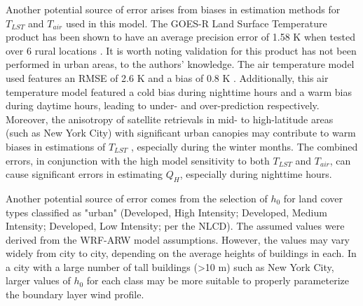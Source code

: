Another potential source of error arises from biases in estimation methods for $T_{LST}$ and $T_{air}$ used in this model. The GOES-R Land Surface Temperature product has been shown to have an average precision error of 1.58 K when tested over 6 rural locations \citep{Yu_2011}. It is worth noting validation for this product has not been performed in urban areas, to the authors' knowledge. The air temperature model used features an RMSE of 2.6 K and a bias of 0.8 K \citep{Hrisko_2020}. Additionally, this air temperature model featured a cold bias during nighttime hours and a warm bias during daytime hours, leading to under- and over-prediction respectively.  Moreover, the anisotropy of satellite retrievals in mid- to high-latitude areas (such as New York City) with significant urban canopies may contribute to warm biases in estimations of $T_{LST}$ \citep{Vinnikov_2012, Wang_2021}, especially during the winter months. The combined errors, in conjunction with the high model sensitivity to both $T_{LST}$ and $T_{air}$, can cause significant errors in estimating $Q_H$, especially during nighttime hours.

Another potential source of error comes from the selection of $h_0$ for land cover types classified as "urban" (Developed, High Intensity; Developed, Medium Intensity; Developed, Low Intensity; per the NLCD). The assumed values were derived from the WRF-ARW model assumptions. However, the values may vary widely from city to city, depending on the average heights of buildings in each. In a city with a large number of tall buildings (\textgreater 10 m) such as New York City, larger values of $h_0$ for each class may be more suitable to properly parameterize the boundary layer wind profile. 

